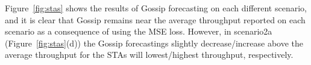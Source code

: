 \documentclass{article}
\begin{document}
Figure~\ref{fig:stas} shows the results of Gossip
forecasting on each different scenario, and it is clear
that Gossip remains near the average throughput reported
on each scenario as a consequence of using the MSE loss.
However, in scenario2a (Figure~\ref{fig:stas}(d)) the Gossip forecastings slightly decrease/increase
above the average throughput for the STAs will lowest/highest
throughput, respectively.






\begin{figure}[h!]%
    \centering
    \\ %
\end{figure}
\end{document}
